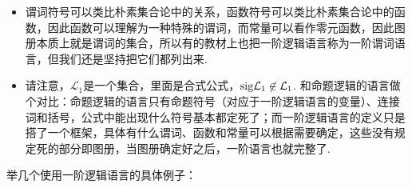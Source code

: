 \documentclass[main.tex]{subfiles}
\begin{document}
\begin{itemize}
    \item 谓词符号可以类比朴素集合论中的关系，函数符号可以类比朴素集合论中的函数，因此函数可以理解为一种特殊的谓词，而常量可以看作零元函数，因此图册本质上就是谓词的集合，所以有的教材上也把一阶逻辑语言称为一阶谓词语言，但我们还是坚持把它们都列出来.
    \item 请注意，\(\mathcal{L}_1\)是一个集合，里面是合式公式，\({\rm sig}\mathcal{L}_1 \not \in \mathcal{L}_1\). 和命题逻辑的语言做个对比：命题逻辑的语言只有命题符号（对应于一阶逻辑语言的变量）、连接词和括号，公式中能出现什么符号基本都定死了；而一阶逻辑语言的定义只是搭了一个框架，具体有什么谓词、函数和常量可以根据需要确定，这些没有规定死的部分即图册，当图册确定好之后，一阶语言也就完整了.
\end{itemize}

举几个使用一阶逻辑语言的具体例子：
\end{document}
